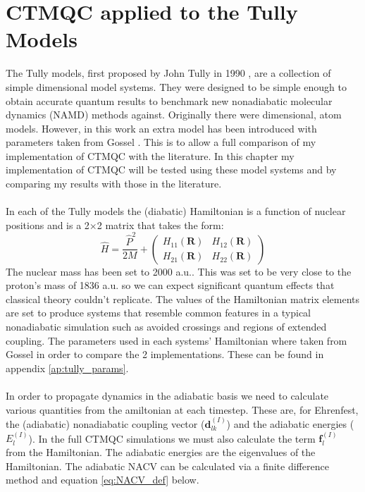 \chapter{CTMQC applied to the Tully Models}
\label{chap:tully_models}

The Tully models, first proposed by John Tully in 1990 \cite{tully_molecular_1990}, are a collection of simple  dimensional model systems. They were designed to be simple enough to obtain accurate quantum results to benchmark new nonadiabatic molecular dynamics (NAMD) methods against. Originally there were  dimensional,  atom models. However, in this work an extra model has been introduced with parameters taken from Gossel \cite{gossel_coupled-trajectory_2018}. This is to allow a full comparison of my implementation of CTMQC with the literature. In this chapter my implementation of CTMQC will be tested using these model systems and by comparing my results with those in the literature.
\\\\
In each of the Tully models the (diabatic) Hamiltonian is a function of nuclear positions and is a 2$\times$2 matrix that takes the form:
\begin{equation}
  \hat{H} = \frac{\ \hat{P} ^2}{2M} + \left(
                                              \begin{array}{cc}
                                                H_{11}(\mathbf{R}) & H_{12}(\mathbf{R}) \\
                                                H_{21}(\mathbf{R}) & H_{22}(\mathbf{R})
                                              \end{array}
                                         \right)
\end{equation}
The nuclear mass has been set to 2000 a.u.. This was set to be very close to the proton's mass of 1836 a.u. so we can expect significant quantum effects that classical theory couldn't replicate. The values of the Hamiltonian matrix elements are set to produce systems that resemble common features in a typical nonadiabatic simulation such as avoided crossings and regions of extended coupling. The parameters used in each systems' Hamiltonian where taken from Gossel \cite{gossel_coupled-trajectory_2018} in order to compare the 2 implementations. These can be found in appendix \ref{ap:tully_params}.
\\\\
In order to propagate dynamics in the adiabatic basis we need to calculate various quantities from the amiltonian at each timestep. These are, for Ehrenfest, the (adiabatic) nonadiabatic coupling vector ($\mathbf{d}_{lk}^{(I)}$) and the adiabatic energies ($E_{l}^{(I)}$). In the full CTMQC simulations we must also calculate the   term $\mathbf{f}_{l}^{(I)}$ from the Hamiltonian. The adiabatic energies are the eigenvalues of the Hamiltonian. The adiabatic NACV can be calculated via a finite difference method and equation \eqref{eq:NACV_def} below.
